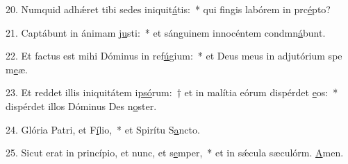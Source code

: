 20. Numquid adhǽret tibi sedes iniquit\uline{á}tis:~* qui fingis labórem in prc\uline{é}pto?\par 
21. Captábunt in ánimam j\uline{u}sti:~* et sánguinem innocéntem condmn\uline{á}bunt.\par 
22. Et factus est mihi Dóminus in ref\uline{ú}gium:~* et Deus meus in adjutórium spe m\uline{e}æ.\par 
23. Et reddet illis iniquitátem i\uline{psó}rum:~† et in malítia eórum dispérdet \uline{e}os:~* dispérdet illos Dóminus Des n\uline{o}ster.\par 
24. Glória Patri, et F\uline{í}lio,~* et Spirítu S\uline{a}ncto.\par 
25. Sicut erat in princípio, et nunc, et s\uline{e}mper,~* et in sǽcula sæculórm. \uline{A}men.\par 
